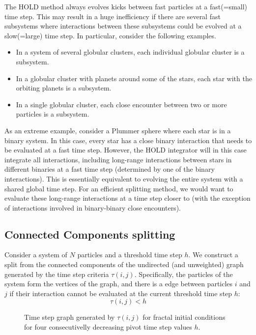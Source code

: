 \documentclass[referee]{aa}
\begin{document}
The HOLD method always evolves kicks between fast particles at a fast(=small)
time step. This may result in a huge inefficiency if there are several
fast subsystems where interactions between these subsystems could
be evolved at a slow(=large) time step. In particular, consider the
following examples.
\begin{itemize}
\item In a system of several globular clusters, each individual globular
cluster is a subsystem.
\item In a globular cluster with planets around some of the stars, each
star with the orbiting planets is a subsystem.
\item In a single globular cluster, each close encounter between two or
more particles is a subsystem.
\end{itemize}
As an extreme example, consider a Plummer sphere where each star is
in a binary system. In this case, every star has a close binary interaction
that needs to be evaluated at a fast time step. However, the HOLD
integrator will in this case integrate all interactions, including
long-range interactions between stars in different binaries at a fast
time step (determined by one of the binary interactions). This is
essentially equivalent to evolving the entire system with a shared
global time step. For an efficient splitting method, we would want
to evaluate these long-range interactions at a time step closer to
(with the exception of interactions involved in binary-binary close
encounters). 


\subsection{Connected Components splitting}

Consider a system of $N$ particles and a threshold time step $h$.
We construct a split from the connected components\cite[Sec B.4]{Cormen:2001uw}
of the undirected (and unweighted) graph generated by the time step
criteria $\tau(i,j)$. Specifically, the particles of the system form
the vertices of the graph, and there is a edge between particles $i$
and $j$ if their interaction cannot be evaluated at the current threshold
time step $h$: 
\[
\tau(i,j)<h
\]


\begin{figure}


\caption{\label{fig:time-step-graph} Time step graph generated by $\tau(i,j)$
for fractal initial conditions for four consecutivelly decreasing
pivot time step values $h$.}
\end{figure}
\end{document}
